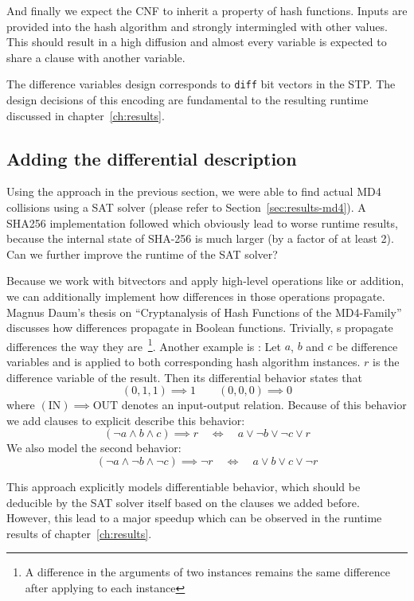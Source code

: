 And finally we expect the CNF to inherit a property of hash functions.
Inputs are provided into the hash algorithm and strongly intermingled
with other values. This should result in a high diffusion and almost every
variable is expected to share a clause with another variable.

The difference variables design corresponds to \texttt{diff} bit vectors
in the STP. The design decisions of this encoding are fundamental to the
resulting runtime discussed in chapter~\ref{ch:results}.

\subsection{Adding the differential description}
\label{sec:enc-diff-desc}
%
Using the approach in the previous section, we were able to find actual MD4 collisions
using a SAT solver (please refer to Section~\ref{sec:results-md4}).
A SHA256 implementation followed which obviously lead to worse
runtime results, because the internal state of SHA-256 is much larger
(by a factor of at least 2). Can we further improve the runtime of the SAT solver?

Because we work with bitvectors and apply high-level operations like  or addition,
we can additionally implement how differences in those operations propagate.
Magnus Daum's thesis on \enquote{Cryptanalysis of Hash Functions of the
MD4-Family}~\cite[Table 4.4]{daum2005cryptanalysis} discusses how differences propagate in
Boolean functions. Trivially, s propagate differences the way they are~\footnote{
A difference in the arguments of two  instances remains the same difference
after applying  to each instance}. Another example is :
Let $a$, $b$ and $c$ be difference variables and  is applied to both corresponding
hash algorithm instances. $r$ is the difference variable of the result.
Then its differential behavior states that
\[ (0, 1, 1) \implies 1 \qquad (0, 0, 0) \implies 0 \]
where $(\text{IN}) \implies \text{OUT}$ denotes an input-output relation.
Because of this behavior we add clauses to explicit describe this behavior:
\[ (\neg a \land b \land c) \implies r \quad \iff \quad a \lor \neg b \lor \neg c \lor r \]
We also model the second behavior:
\[ (\neg a \land \neg b \land \neg c) \implies \neg r \quad \iff \quad a \lor b \lor c \lor \neg r \]

This approach explicitly models differentiable behavior, which should be deducible
by the SAT solver itself based on the clauses we added before.
However, this lead to a major speedup which can be observed in the runtime results
of chapter~\ref{ch:results}.

